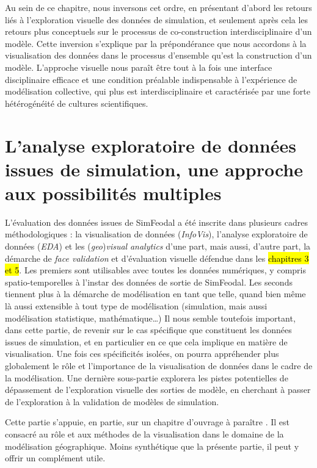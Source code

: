 Au sein de ce chapitre, nous inversons cet ordre, en présentant d'abord les retours liés à l'exploration visuelle des données de simulation, et seulement après cela les retours plus conceptuels sur le processus de co-construction interdisciplinaire d'un modèle.
Cette inversion s'explique par la prépondérance que nous accordons à la visualisation des données dans le processus d'ensemble qu'est la construction d'un modèle.
L'approche visuelle nous paraît être tout à la fois une interface disciplinaire efficace et une condition préalable indispensable à l'expérience de modélisation collective, qui plus est interdisciplinaire et caractérisée par une forte hétérogénéité de cultures scientifiques.

\clearpage
\let\orisectionmark\sectionmark
\renewcommand\sectionmark[1]{}%
\section{L'analyse exploratoire de données issues de simulation, une approche aux possibilités multiples}
\orisectionmark{Retour sur l'analyse de données de simulation}
\let\sectionmark\orisectionmark

L'évaluation des données issues de SimFeodal a été inscrite dans plusieurs cadres méthodologiques :
la visualisation de données (\textit{InfoVis}), l'analyse exploratoire de données (\textit{EDA}) et les (\textit{geo})\textit{visual} \textit{analytics} d'une part, mais aussi, d'autre part, la démarche de \textit{face validation} et d'évaluation visuelle défendue dans les \hl{chapitres 3 et 5}.
Les premiers sont utilisables avec toutes les données numériques, y compris spatio-temporelles à l'instar des données de sortie de SimFeodal.
Les seconds tiennent plus à la démarche de modélisation en tant que telle, quand bien même là aussi extensible à tout type de modélisation (simulation, mais aussi modélisation statistique, mathématique\ldots)
Il nous semble toutefois important, dans cette partie, de revenir sur le cas spécifique que constituent les données issues de simulation, et en particulier en ce que cela implique en matière de visualisation.
Une fois ces spécificités isolées, on pourra appréhender plus globalement le rôle et l'importance de la visualisation de données dans le cadre de la modélisation.
Une dernière sous-partie explorera les pistes potentielles de dépassement de l'exploration visuelle des sorties de modèle, en cherchant à passer de l'exploration à la validation de modèles de simulation.

\begin{tcolorbox}[breakable,left=0pt,right=0pt,top=0pt,bottom=0pt,
	colback=gray!15,colframe=gray!15,width=\dimexpr\textwidth\relax, 
	enlarge left by=0mm, boxsep=5pt,arc=0pt,outer arc=0pt]
	Cette partie s'appuie, en partie, sur un chapitre d'ouvrage à paraître \autocite{cura_visualisation_2020}.
	Il est consacré au rôle et aux méthodes de la visualisation dans le domaine de la modélisation géographique.
	Moins synthétique que la présente partie, il peut y offrir un complément utile.
\end{tcolorbox}



